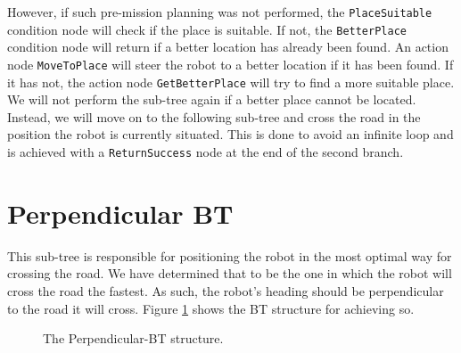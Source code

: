     However, if such pre-mission planning was not performed, the \texttt{PlaceSuitable} condition node will check if the place is suitable. If not, the \texttt{BetterPlace} condition node will return if a better location has already been found. An action node \texttt{MoveToPlace} will steer the robot to a better location if it has been found. If it has not, the action node \texttt{GetBetterPlace} will try to find a more suitable place.\\
    We will not perform the sub-tree again if a better place cannot be located. Instead, we will move on to the following sub-tree and cross the road in the position the robot is currently situated. This is done to avoid an infinite loop and is achieved with a \texttt{ReturnSuccess} node at the end of the second branch.

\section{Perpendicular BT}
\label{sec:Perpendicular-BT}
    This sub-tree is responsible for positioning the robot in the most optimal way for crossing the road. We have determined that to be the one in which the robot will cross the road the fastest. As such, the robot's heading should be perpendicular to the road it will cross. Figure \ref{fig:Perpendicular-BT} shows the BT structure for achieving so.\\
    \begin{figure}[ht]
        \caption{The Perpendicular-BT structure.}
        \label{fig:Perpendicular-BT}
    \end{figure}
